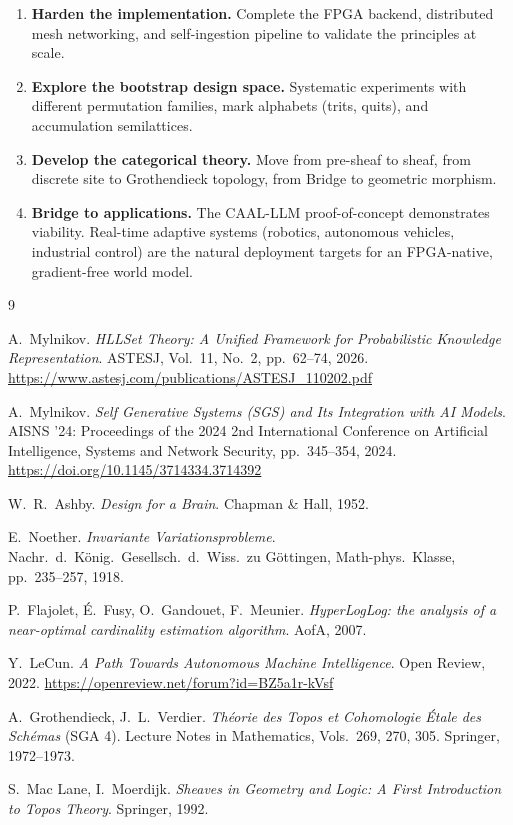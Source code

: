 \documentclass[11pt,a4paper]{article}
\theoremstyle{remark}
\begin{document}
\begin{enumerate}[leftmargin=*,nosep]
  \item \textbf{Harden the implementation.} Complete the FPGA backend, distributed mesh
    networking, and self-ingestion pipeline to validate the principles at scale.
  \item \textbf{Explore the bootstrap design space.} Systematic experiments with
    different permutation families, mark alphabets (trits, quits), and accumulation
    semilattices.
  \item \textbf{Develop the categorical theory.} Move from pre-sheaf to sheaf, from
    discrete site to Grothendieck topology, from Bridge to geometric morphism.
  \item \textbf{Bridge to applications.} The CAAL-LLM proof-of-concept demonstrates
    viability. Real-time adaptive systems (robotics, autonomous vehicles, industrial
    control) are the natural deployment targets for an FPGA-native, gradient-free world
    model.
\end{enumerate}


\begin{thebibliography}{9}

A.~Mylnikov.
\emph{HLLSet Theory: A Unified Framework for Probabilistic Knowledge Representation}.
ASTESJ, Vol.~11, No.~2, pp.~62--74, 2026.
\url{https://www.astesj.com/publications/ASTESJ_110202.pdf}

A.~Mylnikov.
\emph{Self Generative Systems (SGS) and Its Integration with AI Models}.
AISNS '24: Proceedings of the 2024 2nd International Conference on Artificial
Intelligence, Systems and Network Security, pp.~345--354, 2024.
\url{https://doi.org/10.1145/3714334.3714392}

W.~R.~Ashby.
\emph{Design for a Brain}.
Chapman \& Hall, 1952.

E.~Noether.
\emph{Invariante Variationsprobleme}.
Nachr.~d.~K\"onig.~Gesellsch.~d.~Wiss.~zu G\"ottingen, Math-phys.~Klasse,
pp.~235--257, 1918.

P.~Flajolet, \'{E}.~Fusy, O.~Gandouet, F.~Meunier.
\emph{HyperLogLog: the analysis of a near-optimal cardinality estimation algorithm}.
AofA, 2007.

Y.~LeCun.
\emph{A Path Towards Autonomous Machine Intelligence}.
Open Review, 2022.
\url{https://openreview.net/forum?id=BZ5a1r-kVsf}

A.~Grothendieck, J.~L.~Verdier.
\emph{Th\'eorie des Topos et Cohomologie \'Etale des Sch\'emas} (SGA 4).
Lecture Notes in Mathematics, Vols.~269, 270, 305. Springer, 1972--1973.

S.~Mac Lane, I.~Moerdijk.
\emph{Sheaves in Geometry and Logic: A First Introduction to Topos Theory}.
Springer, 1992.

\end{thebibliography}
\end{document}
